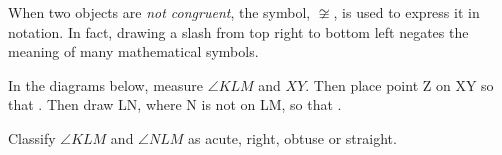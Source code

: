 	When two objects are \emph{not congruent}, the symbol, $\not\cong$, is used to express it in notation.  In fact, drawing a slash from top right to bottom left negates the meaning of many mathematical symbols.

\smallskip	

\noindent \q In the diagrams below, measure $\angle KLM$ and $XY$.  Then place point \pnt Z on \ray XY so that .  Then draw \ray LN, where \pnt N is not on \ray LM, so that .

\medskip

\noindent

	
\noindent \q Classify $\angle KLM$ and $\angle NLM$ as acute, right, obtuse or straight.	

\medskip

